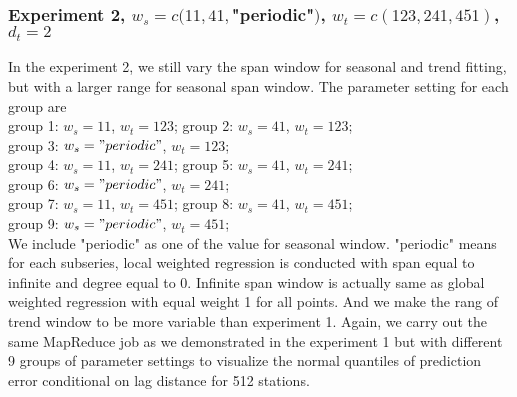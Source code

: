 \subsubsection{Experiment 2,  
\textmd{$w_s=c(11, 41, $"periodic"$)$, $w_t=c(123, 241, 451)$, $d_t=2$}
}

In the experiment 2, we still vary the span window for seasonal and trend fitting,
but with a larger range for seasonal span window. The parameter setting for each 
group are
\\
group 1: $w_s = 11$, $w_t = 123$;
group 2: $w_s = 41$, $w_t = 123$;\\
group 3: $w_s = "periodic"$, $w_t = 123$;\\
group 4: $w_s = 11$, $w_t = 241$;
group 5: $w_s = 41$, $w_t = 241$;\\
group 6: $w_s = "periodic"$, $w_t = 241$;\\
group 7: $w_s = 11$, $w_t = 451$;
group 8: $w_s = 41$, $w_t = 451$;\\
group 9: $w_s = "periodic"$, $w_t = 451$;
\\
We include "periodic" as one 
of the value for seasonal window. "periodic" means for each subseries, local 
weighted regression is conducted with span equal to infinite and degree equal to 
0. Infinite span window is actually same as global weighted regression with equal 
weight 1 for all points. And we make the rang of trend window to be more 
variable than experiment 1.
Again, we carry out the same MapReduce job as we demonstrated in the experiment
1 but with different 9 groups of parameter settings to visualize the normal 
quantiles of prediction error conditional on lag distance for 512 stations.


